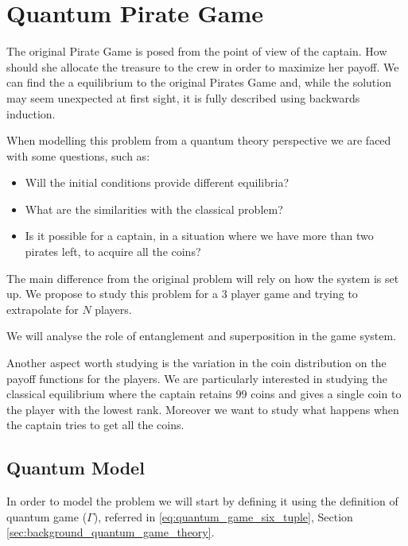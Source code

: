 
\section{Quantum Pirate Game}
\label{sec:quantum_pirate}

The original Pirate Game is posed from the point of view of the captain. How should she allocate the treasure to the crew in order to maximize her payoff.
We can find the a equilibrium to the original Pirates Game and, while the solution may seem unexpected at first sight, it is fully described using backwards induction. 

When modelling this problem from a quantum theory perspective we are faced with some questions, such as:

\begin{itemize}
\item Will the initial conditions provide different equilibria? 

\item What are the similarities with the classical problem? 

\item Is it possible for a captain, in a situation where we have more than two pirates left, to acquire all the coins?

\end{itemize} 

The main difference from the original problem will rely on how the system is set up. 
We propose to study this problem for a $3$ player game and trying to extrapolate for $N$ players. 

We will analyse the role of entanglement and superposition in the game system. 

Another aspect worth studying is the variation in the coin distribution on the payoff functions for the players. We are particularly interested in studying the classical equilibrium where the captain retains $99$ coins and gives a single coin to the player with the lowest rank. Moreover we want to study what happens when the captain tries to get all the coins.



\subsection{Quantum Model}
\label{subsec:description_2}

In order to model the problem we will start by defining it using the definition of quantum game ($\Gamma$), referred in \ref{eq:quantum_game_six_tuple}, Section \ref{sec:background_quantum_game_theory}\cite{Fra2011a}.

